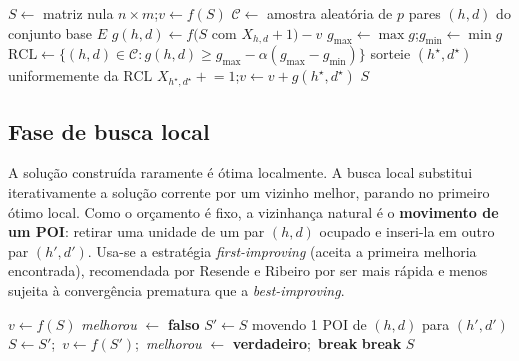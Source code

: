 \documentclass[11pt,a4paper]{article}
\begin{document}
\begin{algorithm}[ht]
\caption{Construção gulosa-aleatória (maximização, \emph{sampled greedy})}
\label{alg:cons}
\begin{algorithmic}[1]
\State $S \gets$ matriz nula $n\times m$;\quad $v \gets f(S)$
  \State $\mathcal{C} \gets$ amostra aleatória de $p$ pares $(h,d)$ do conjunto base $E$
    \State $g(h,d) \gets f\bigl(S \text{ com } X_{h,d}{+}1\bigr) - v$ 
  \EndFor
  \State $g_{\max}\gets \max g$;\quad $g_{\min}\gets \min g$
  \State $\mathrm{RCL}\gets\{(h,d)\in\mathcal{C}: g(h,d)\ge g_{\max}-\alpha(g_{\max}-g_{\min})\}$
  \State sorteie $(h^\star,d^\star)$ uniformemente da $\mathrm{RCL}$
  \State $X_{h^\star,d^\star}\mathrel{+}=1$;\quad $v \gets v + g(h^\star,d^\star)$
\EndFor
\State \Return $S$
\end{algorithmic}
\end{algorithm}

\subsection{Fase de busca local}

A solução construída raramente é ótima localmente. A busca local substitui
iterativamente a solução corrente por um vizinho melhor, parando no primeiro
ótimo local. Como o orçamento é fixo, a vizinhança natural é o \textbf{movimento de
um POI}: retirar uma unidade de um par $(h,d)$ ocupado e inseri-la em outro par
$(h',d')$. Usa-se a estratégia \emph{first-improving} (aceita a primeira melhoria
encontrada), recomendada por Resende e Ribeiro por ser mais rápida e menos sujeita
à convergência prematura que a \emph{best-improving}.

\begin{algorithm}[ht]
\caption{Busca local \emph{first-improving} (movimento de 1 POI)}
\label{alg:ls}
\begin{algorithmic}[1]
\State $v \gets f(S)$
\Repeat
  \State \textit{melhorou} $\gets$ \textbf{falso}
      \State $S' \gets S$ movendo 1 POI de $(h,d)$ para $(h',d')$
        \State $S \gets S'$;\ $v \gets f(S')$;\ \textit{melhorou} $\gets$ \textbf{verdadeiro};\ \textbf{break}
      \EndIf
    \EndFor
     \textbf{break} \EndIf
  \EndFor
{}
\State \Return $S$
\end{algorithmic}
\end{algorithm}
\end{document}
